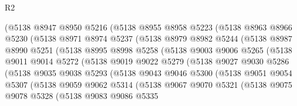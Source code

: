 \begin{lexlean}{R2}
\begin{coremodule}
            (@5138
              @8947
              @8950
              @5216
              (@5138
                @8955
                @8958
                @5223
                (@5138
                  @8963
                  @8966
                  @5230
                  (@5138
                    @8971
                    @8974
                    @5237
                    (@5138
                      @8979
                      @8982
                      @5244
                      (@5138
                        @8987
                        @8990
                        @5251
                        (@5138
                          @8995
                          @8998
                          @5258
                          (@5138
                            @9003
                            @9006
                            @5265
                            (@5138
                              @9011
                              @9014
                              @5272
                              (@5138
                                @9019
                                @9022
                                @5279
                                (@5138
                                  @9027
                                  @9030
                                  @5286
                                  (@5138
                                    @9035
                                    @9038
                                    @5293
                                    (@5138
                                      @9043
                                      @9046
                                      @5300
                                      (@5138
                                        @9051
                                        @9054
                                        @5307
                                        (@5138
                                          @9059
                                          @9062
                                          @5314
                                          (@5138
                                            @9067
                                            @9070
                                            @5321
                                            (@5138
                                              @9075
                                              @9078
                                              @5328
                                              (@5138
                                                @9083
                                                @9086
                                                @5335

\end{coremodule}
\end{lexlean}
